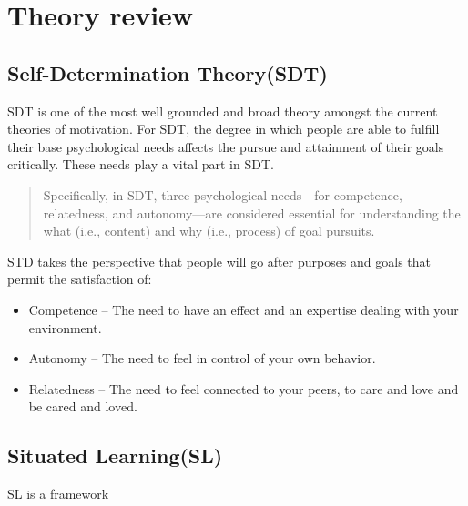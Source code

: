 \section{Theory review}

\subsection{Self-Determination Theory(SDT)}

SDT is one of the most well grounded
\cite{motivation:handbook_self_determination} and broad theory amongst the
current theories of motivation. For SDT, the degree in which people are able to
fulfill their base psychological needs affects the pursue and attainment of
their goals critically. These needs play a vital part in SDT.

\begin{quote}
    Specifically, in SDT, three psychological needs—for competence, relatedness, and
    autonomy—are considered essential for understanding the what (i.e., content) and
    why (i.e., process) of goal pursuits. \cite{motivation:ryan_deci__what_and_why} 
\end{quote}

STD takes the perspective that people will go after purposes and goals that
permit the satisfaction of: \cite{motivation:ryan_deci__what_and_why} 

\begin{itemize}
    \item Competence -- The need to have an effect and an expertise dealing with
    your environment.
    \item Autonomy -- The need to feel in control of your own behavior.
    \item Relatedness -- The need to feel connected to your peers, to care and
    love and be cared and loved.
\end{itemize} 

\subsection{Situated Learning(SL)}

SL is a framework \cite{education:greeno__learning_activity} 



